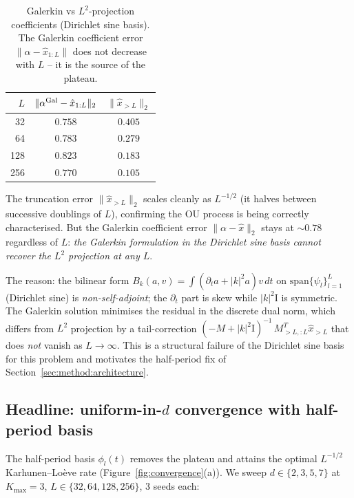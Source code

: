\begin{table}[h]
\centering
\caption{Galerkin vs $L^2$-projection coefficients (Dirichlet sine basis).
The Galerkin coefficient error $\|\alpha - \hat x_{1:L}\|$ does not
decrease with $L$ -- it is the source of the plateau.}
\label{tab:galerkin-vs-l2}
\begin{tabular}{rcc}
\toprule
$L$ & $\|\alpha^{\rm Gal} - \hat x_{1:L}\|_2$ & $\|\hat x_{> L}\|_2$ \\
\midrule
32  & $0.758$ & $0.405$ \\
64  & $0.783$ & $0.279$ \\
128 & $0.823$ & $0.183$ \\
256 & $0.770$ & $0.105$ \\
\bottomrule
\end{tabular}
\end{table}

The truncation error $\|\hat x_{> L}\|_2$ scales cleanly as $L^{-1/2}$
(it halves between successive doublings of $L$), confirming the OU
process is being correctly characterised. But the Galerkin coefficient
error $\|\alpha - \hat x\|_2$ stays at $\sim 0.78$ regardless of $L$:
\emph{the Galerkin formulation in the Dirichlet sine basis cannot
recover the $L^2$ projection at any $L$}.

The reason: the bilinear form $B_k(a, v) = \int(\partial_t a + |k|^2 a)
v\, dt$ on $\mathrm{span}\{\psi_l\}_{l=1}^L$ (Dirichlet sine) is
\emph{non-self-adjoint}; the $\partial_t$ part is skew while
$|k|^2 \mathrm{I}$ is symmetric. The Galerkin solution
minimises the residual in the discrete dual norm, which differs from
$L^2$ projection by a tail-correction
$(-M + |k|^2 \mathrm{I})^{-1}\,M_{>L, :L}^T \hat x_{>L}$ that does
\emph{not} vanish as $L \to \infty$. This is a structural failure of
the Dirichlet sine basis for this problem and motivates the
half-period fix of Section~\ref{sec:method:architecture}.

\subsection{Headline: uniform-in-$d$ convergence with half-period basis}
\label{sec:exp:d-sweep}

The half-period basis $\phi_l(t)$ removes the plateau and attains the optimal
$L^{-1/2}$ Karhunen--Lo\`eve rate (Figure~\ref{fig:convergence}(a)). We sweep
$d \in \{2, 3, 5, 7\}$ at $K_{\max} = 3$, $L \in \{32, 64, 128, 256\}$,
3 seeds each:

